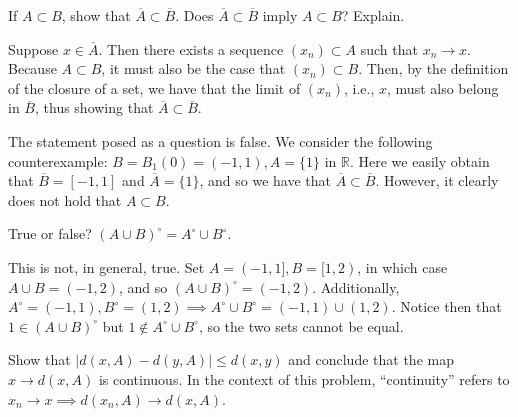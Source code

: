 \begin{exercise}{20}
    If $A \subset B$, show that $\overline{A} \subset \overline{B}$.
    Does $\overline{A} \subset \overline{B}$ imply $A \subset B$?
    Explain.
\end{exercise}

\begin{solution}
    
    Suppose $x \in \overline{A}$.
    Then there exists a sequence $(x_n) \subset A$ such that $x_n \rightarrow x$.
    Because $A \subset B$, it must also be the case that $(x_n) \subset B$.
    Then, by the definition of the closure of a set, we have that the limit of $(x_n)$, i.e., $x$, must also belong in $\overline{B}$, thus showing that $\overline{A} \subset \overline{B}$.

    The statement posed as a question is false.
    We consider the following counterexample: $B = B_{1}(0) = (-1, 1), A = \{1\}$ in $\mathbb{R}$.
    Here we easily obtain that $\overline{B} = [-1, 1]$ and $\overline{A} = \{1\}$, and so we have that $\overline{A} \subset \overline{B}$.
    However, it clearly does not hold that $A \subset B$.
\end{solution}

\begin{exercise}{22}
    True or false? $(A \cup B)^{\circ} = A^\circ \cup B^\circ$.
\end{exercise}

\begin{solution}

    This is not, in general, true.
    Set $A = (-1, 1], B = [1, 2)$, in which case $A \cup B = (-1, 2)$, and so $(A \cup B)^\circ = (-1, 2)$.
    Additionally, $A^\circ = (-1, 1), B^\circ = (1, 2) \implies A^\circ \cup B^\circ = (-1, 1) \cup (1, 2)$.
    Notice then that $1 \in (A \cup B)^\circ$ but $1 \notin A^\circ \cup B^\circ$, so the two sets cannot be equal.
\end{solution}

\begin{exercise}{27}
    Show that $\lvert d(x, A) - d(y, A) \rvert \leq d(x, y)$ and conclude that the map $x \rightarrow d(x, A)$ is continuous.
    In the context of this problem, ``continuity'' refers to $x_n \rightarrow x \implies d(x_n, A) \rightarrow d(x, A)$.
\end{exercise}

